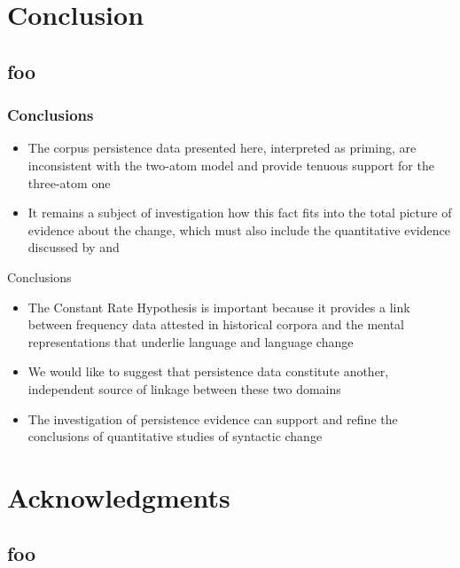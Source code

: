 \documentclass{digs-slides}
\begin{document}
\section{Conclusion}
\label{sec:conclusion}

\subsection*{foo}

\begin{frame}
    \frametitle{Conclusions}
    \begin{itemize}
      \item The corpus persistence data presented here, interpreted as
        priming, are inconsistent with the two-atom model and provide
        tenuous support for the three-atom one

      \item It remains a subject of investigation how this fact fits
        into the total picture of evidence about the change, which must
        also include the quantitative evidence discussed by
        \textcite{Frisch1997} and \textcite{wallage08}
    \end{itemize}
\end{frame}

\begin{frame}{Conclusions}
    \begin{itemize}
      \item The Constant Rate Hypothesis is important because it
        provides a link between frequency data attested in historical
        corpora and the mental representations that underlie language
        and language change
      \item We would like to suggest that persistence data constitute
        another, independent source of linkage between these two domains
      \item The investigation of persistence evidence can support and refine
        the conclusions of quantitative studies of syntactic change
    \end{itemize}
\end{frame}

\appendix{}

\section{Acknowledgments}

\subsection{foo}
\end{document}
